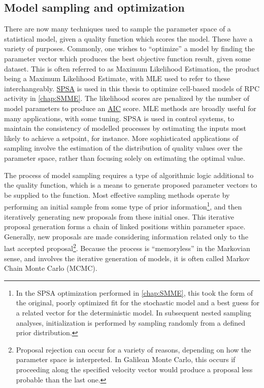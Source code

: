 \subsection{Model sampling and optimization}
\label{sampleoptim}
There are now many techniques used to sample the parameter space of a statistical model, given a quality function which scores the model. These have a variety of purposes. Commonly, one wishes to ``optimize'' a model by finding the parameter vector which produces the best objective function result, given some dataset. This is often referred to as Maximum Likelihood Estimation, the product being a Maximum Likelihood Estimate, with MLE used to refer to these interchangeably. \hyperref[ssec:SPSA]{SPSA} is used in this thesis to optimize cell-based models of RPC activity in \autoref{chap:SMME}. The likelihood scores are penalized by the number of model parameters to produce an \hyperref[ssec:AIC]{AIC} score. MLE methods are broadly useful for many applications, with some tuning. SPSA is used in control systems, to maintain the consistency of modelled processes by estimating the inputs most likely to achieve a setpoint, for instance. More sophisticated applications of sampling involve the estimation of the distribution of quality values over the parameter space, rather than focusing solely on estimating the optimal value.

The process of model sampling requires a type of algorithmic logic additional to the quality function, which is a means to generate proposed parameter vectors to be supplied to the function. Most effective sampling methods operate by performing an initial sample from some type of prior information\footnote{In the SPSA optimization performed in \autoref{chap:SMME}, this took the form of the original, poorly optimized fit for the stochastic model and a best guess for a related vector for the deterministic model. In subsequent nested sampling analyses, initialization is performed by sampling randomly from a defined prior distribution.}, and then iteratively generating new proposals from these initial ones. This iterative proposal generation forms a chain of linked positions within parameter space. Generally, new proposals are made considering information related only to the last accepted proposal\footnote{Proposal rejection can occur for a variety of reasons, depending on how the parameter space is interpreted. In Galilean Monte Carlo, this occurs if proceeding along the specified velocity vector would produce a proposal less probable than the last one.}. Because the process is ``memoryless'' in the Markovian sense, and involves the iterative generation of models, it is often called Markov Chain Monte Carlo (MCMC).

